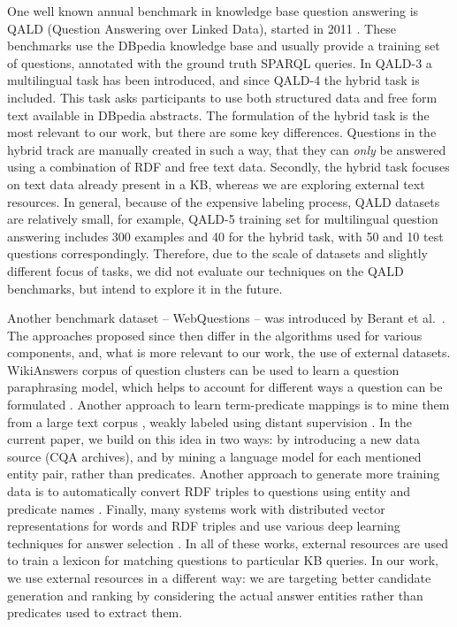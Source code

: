 One well known annual benchmark in knowledge base question answering is QALD (Question Answering over Linked Data), started in 2011 \cite{UngerFLNCCW15}.
These benchmarks use the DBpedia knowledge base and usually provide a training set of questions, annotated with the ground truth SPARQL queries.
In QALD-3 a multilingual task has been introduced, and since QALD-4 the hybrid task is included.
This task asks participants to use both structured data and free form text available in DBpedia abstracts.
The formulation of the hybrid task is the most relevant to our work, but there are some key differences.
Questions in the hybrid track are manually created in such a way, that they can \textit{only} be answered using a combination of RDF and free text data.
Secondly, the hybrid task focuses on text data already present in a KB, whereas we are exploring external text resources.
In general, because of the expensive labeling process, QALD datasets are relatively small, for example, QALD-5 training set for multilingual question answering includes 300 examples and 40 for the hybrid task, with 50 and 10 test questions correspondingly.
Therefore, due to the scale of datasets and slightly different focus of tasks, we did not evaluate our techniques on the QALD benchmarks, but intend to explore it in the future.

Another benchmark dataset -- WebQuestions -- was introduced by Berant et al.~\cite{Berant:EMNLP13}.
The approaches proposed since then differ in the algorithms used for various components, and, what is more relevant to our work, the use of external datasets.
WikiAnswers corpus of question clusters can be used to learn a question paraphrasing model, which helps to account for different ways a question can be formulated \cite{berant2014semantic}.
Another approach to learn term-predicate mappings is to mine them from a large text corpus \cite{yao2014information}, weakly labeled using distant supervision \cite{mintz2009distant}.
In the current paper, we build on this idea in two ways: by introducing a new data source (CQA archives), and by mining a language model for each mentioned entity pair, rather than predicates.
Another approach to generate more training data is to automatically convert RDF triples to questions using entity and predicate names \cite{BordesCW14:emnlp}.
Finally, many systems work with distributed vector representations for words and RDF triples and use various deep learning techniques for answer selection \cite{BordesCW14:emnlp,yih2015semantic}.
In all of these works, external resources are used to train a lexicon for matching questions to particular KB queries.
In our work, we use external resources in a different way: we are targeting better candidate generation and ranking by considering the actual answer entities rather than predicates used to extract them.

